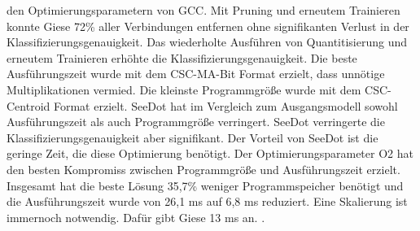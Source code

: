 den Optimierungsparametern von GCC. Mit Pruning und erneutem Trainieren konnte Giese 72\% aller Verbindungen entfernen ohne signifikanten Verlust in der Klassifizierungsgenauigkeit. Das wiederholte Ausführen von Quantitisierung und
erneutem Trainieren erhöhte die Klassifizierungsgenauigkeit. Die beste Ausführungszeit wurde mit dem CSC-MA-Bit Format erzielt, dass unnötige Multiplikationen vermied. Die kleinste Programmgröße wurde mit dem
CSC-Centroid Format erzielt. SeeDot hat im Vergleich zum Ausgangsmodell sowohl Ausführungszeit als auch Programmgröße verringert. SeeDot verringerte die Klassifizierungsgenauigkeit aber signifikant. Der Vorteil von SeeDot
ist die geringe Zeit, die diese Optimierung benötigt. Der Optimierungsparameter O2 hat den besten Kompromiss zwischen Programmgröße und Ausführungszeit erzielt. Insgesamt hat die beste Lösung 35,7\% weniger Programmspeicher
benötigt und die Ausführungszeit wurde von 26,1 ms auf 6,8 ms reduziert. Eine Skalierung ist immernoch notwendig. Dafür gibt Giese 13 ms an. \cite{gieseThesis}.